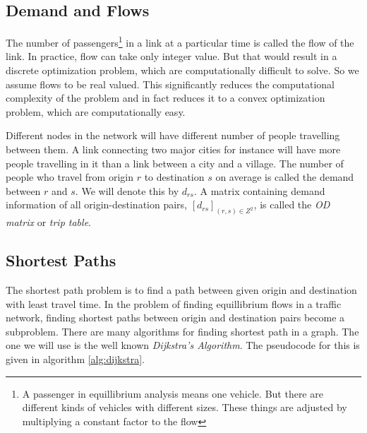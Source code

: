 	\subsection{Demand and Flows}
	The number of passengers\footnote{A passenger in equillibrium analysis
	means one vehicle. But there are different kinds of vehicles
	with different sizes. These things are adjusted by
	multiplying a constant factor to the flow}
	in a link at a particular time
	is called the flow of the link. In practice, flow can take
	only integer value. But that would result in a discrete optimization
	problem, which are computationally difficult to solve. So we assume flows
	to be real valued. This significantly reduces the computational
	complexity of the problem and in fact reduces it to a convex
	optimization problem, which are computationally easy.

	Different nodes in the network will have different number of
	people travelling between them. A link connecting two major
	cities for instance will have more people travelling in it
	than a link between a city and a village.
	The number of people who travel from origin $r$ to destination
	$s$ on average is called the demand between $r$ and $s$. We
	will denote this by $d_{rs}$. A matrix containing demand information
	of all origin-destination pairs, $[d_{rs}]_{(r,s)\in Z^2}$,
	is called the \emph{OD matrix} or \emph{trip table}.


	\subsection{Shortest Paths}
	The shortest path problem is to find a path between given origin
	and destination with least travel time.
	In the problem of finding equillibrium flows in a traffic network,
	finding shortest paths between origin and destination pairs
	become a subproblem.
	There are many algorithms for finding shortest path in a graph.
	The one we will use is the well known \emph{Dijkstra's Algorithm}.
	The pseudocode for this is given in algorithm \ref{alg:dijkstra}.
	
	
